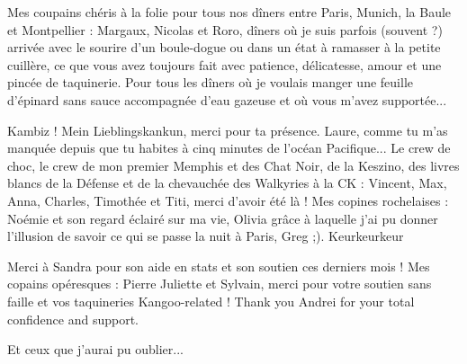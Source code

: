 \documentclass[11pt, oneside]{Thesis} %
\begin{document}
{Mes coupains chéris à la folie pour tous nos dîners entre Paris, Munich, la Baule et Montpellier : Margaux, Nicolas et Roro, dîners où je suis parfois (souvent ?) arrivée avec le sourire d'un boule-dogue ou dans un état à ramasser à la petite cuillère, ce que vous avez toujours fait avec patience, délicatesse, amour et une pincée de taquinerie. Pour tous les dîners où je voulais manger une feuille d'épinard sans sauce accompagnée d'eau gazeuse et où vous m'avez supportée...

Kambiz ! Mein Lieblingskankun, merci pour ta présence. Laure, comme tu m'as manquée depuis que tu habites à cinq minutes de l'océan Pacifique... Le crew de choc, le crew de mon premier Memphis et des Chat Noir, de la Keszino, des livres blancs de la Défense et de la chevauchée des Walkyries à la CK : Vincent, Max, Anna, Charles, Timothée et Titi, merci d'avoir été là ! Mes copines rochelaises : Noémie et son regard éclairé sur ma vie, Olivia grâce à laquelle j'ai pu donner l'illusion de savoir ce qui se passe la nuit à Paris, Greg ;). Keurkeurkeur

Merci à Sandra pour son aide en stats et son soutien ces derniers mois ! Mes copains opéresques : Pierre Juliette et Sylvain, merci pour votre soutien sans faille et vos taquineries Kangoo-related ! Thank you Andrei for your total confidence and support. 

Et ceux que j'aurai pu oublier...
 }
 
% 
% 
% 
%
% 
% 
 \clearpage %


\pagestyle{fancy} %

\tableofcontents %

\listoffigures %
\end{document}
